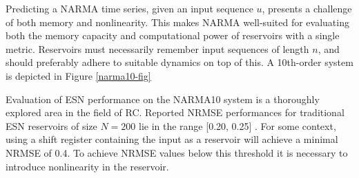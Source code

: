 Predicting a NARMA time series, given an input sequence $u$, presents a
challenge of both memory and nonlinearity. This makes NARMA well-suited for
evaluating both the memory capacity and computational power of reservoirs with a
single metric. Reservoirs must necessarily remember input sequences of length
$n$, and should preferably adhere to suitable dynamics on top of this. A 10th-order system is depicted in Figure \ref{narma10-fig}

Evaluation of ESN performance on the NARMA10 system is a thoroughly explored
area in the field of RC. Reported NRMSE performances for traditional ESN
reservoirs of size $N = 200$ lie in the range [0.20, 0.25]
\cite{verstraeten_experimental_2007, goudarzi_comparative_2014,
rodan_minimum_2011, jaeger_adaptive_2003}. For some context, using a shift
register containing the input as a reservoir will achieve a minimal NRMSE of
0.4. To achieve NRMSE values below this threshold it is necessary to introduce
nonlinearity in the reservoir.

